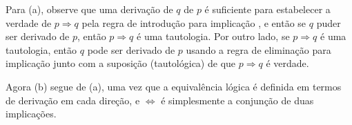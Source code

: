 \begin{cproof}
Para (a), observe que uma derivação de $q$ de $p$ é suficiente para estabelecer a verdade de $p \Rightarrow q$ pela regra de introdução para implicação \introrule{\Rightarrow}, e então se $q$ puder ser derivado de $p$, então $p \Rightarrow q$ é uma tautologia. Por outro lado, se $p \Rightarrow q$ é uma tautologia, então $q$ pode ser derivado de $p$ usando a regra de eliminação para implicação \elimrule{\Rightarrow} junto com a suposição (tautológica) de que $p \Rightarrow q$ é verdade.

Agora (b) segue de (a), uma vez que a equivalência lógica é definida em termos de derivação em cada direção, e $\Leftrightarrow$ é simplesmente a conjunção de duas implicações.
\end{cproof}



